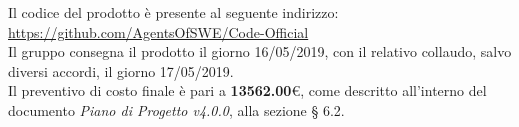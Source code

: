 \documentclass[11pt, a4paper]{letter} %
\begin{document}
\begin{letter}
\begin{itemize}
		\end{itemize}
		Il codice del prodotto è presente al seguente indirizzo: \url{https://github.com/AgentsOfSWE/Code-Official}\\
		Il gruppo consegna il prodotto il giorno 16/05/2019, con il relativo collaudo, salvo diversi accordi, il giorno 17/05/2019.\\  
		Il preventivo di costo finale è pari a \textbf{13562.00}€, come descritto all'interno del documento \textit{Piano di Progetto v4.0.0}, alla sezione § 6.2.\\ %

\end{letter}
\end{document}
